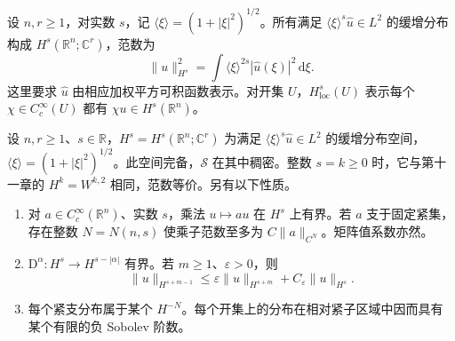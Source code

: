 \begin{definition}\label{g3:def:fourier-sobolev}
	设 \(n,r\ge1\)，对实数 \(s\)，记 \(\langle\xi\rangle=(1+|\xi|^2)^{1/2}\)。所有满足 \(\langle\xi\rangle^s\widehat u\in L^2\) 的缓增分布构成 \(H^s(\mathbb R^n;\mathbb C^r)\)，范数为
	\[
		\|u\|_{H^s}^2=\int\langle\xi\rangle^{2s}|\widehat u(\xi)|^2\,\mathrm d\xi.
	\]
	这里要求 \(\widehat u\) 由相应加权平方可积函数表示。对开集 \(U\)，\(H^s_{\mathrm{loc}}(U)\) 表示每个 \(\chi\in C_c^\infty(U)\) 都有 \(\chi u\in H^s(\mathbb R^n)\)。
\end{definition}

\begin{lemma}\label{g3:lem:fourier-sobolev-tools}
	设 \(n,r\ge1\)、\(s\in\mathbb R\)，\(H^s=H^s(\mathbb R^n;\mathbb C^r)\) 为满足 \(\langle\xi\rangle^s\widehat u\in L^2\) 的缓增分布空间，\(\langle\xi\rangle=(1+|\xi|^2)^{1/2}\)。此空间完备，\(\mathcal S\) 在其中稠密。整数 \(s=k\ge0\) 时，它与第十一章的 \(H^k=W^{k,2}\) 相同，范数等价。另有以下性质。
	\begin{enumerate}
		\item 对 \(a\in C_c^\infty(\mathbb R^n)\)、实数 \(s\)，乘法 \(u\mapsto au\) 在 \(H^s\) 上有界。若 \(a\) 支于固定紧集，存在整数 \(N=N(n,s)\) 使乘子范数至多为 \(C\|a\|_{C^N}\)。矩阵值系数亦然。
		\item \(\mathrm D^\alpha:H^s\to H^{s-|\alpha|}\) 有界。若 \(m\ge1\)、\(\varepsilon>0\)，则
		\[
			\|u\|_{H^{s+m-1}}\le\varepsilon\|u\|_{H^{s+m}}+C_\varepsilon\|u\|_{H^s}.
		\]
		\item 每个紧支分布属于某个 \(H^{-N}\)。每个开集上的分布在相对紧子区域中因而具有某个有限的负 Sobolev 阶数。
	\end{enumerate}
\end{lemma}
